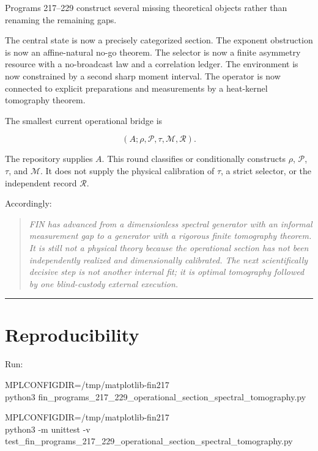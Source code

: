 \documentclass[11pt,a4paper,openany]{report}
\begin{document}
Programs 217--229 construct several missing theoretical objects rather than renaming the remaining gaps.

The central state is now a precisely categorized section. The exponent obstruction is now an affine-natural no-go theorem. The selector is now a finite asymmetry resource with a no-broadcast law and a correlation ledger. The environment is now constrained by a second sharp moment interval. The operator is now connected to explicit preparations and measurements by a heat-kernel tomography theorem.

The smallest current operational bridge is

\[
(A;\rho,\mathcal P,\tau,\mathcal M,\mathcal R).
\]

The repository supplies \(A\). This round classifies or conditionally constructs \(\rho\), \(\mathcal P\), \(\tau\), and \(\mathcal M\). It does not supply the physical calibration of \(\tau\), a strict selector, or the independent record \(\mathcal R\).

Accordingly:

\begin{quote}\itshape
FIN has advanced from a dimensionless spectral generator with an informal measurement gap to a generator with a rigorous finite tomography theorem. It is still not a physical theory because the operational section has not been independently realized and dimensionally calibrated. The next scientifically decisive step is not another internal fit; it is optimal tomography followed by one blind-custody external execution.

\end{quote}

\par\medskip\hrule\medskip

\chapter{Reproducibility}

Run:

MPLCONFIGDIR=/\allowbreak{}tmp/\allowbreak{}matplotlib-fin217 \\
python3 fin\_programs\_217\_229\_operational\_section\_spectral\_tomography.py

MPLCONFIGDIR=/\allowbreak{}tmp/\allowbreak{}matplotlib-fin217 \\
python3 -m unittest -v \\
test\_fin\_programs\_217\_229\_operational\_section\_spectral\_tomography.py
\end{document}
